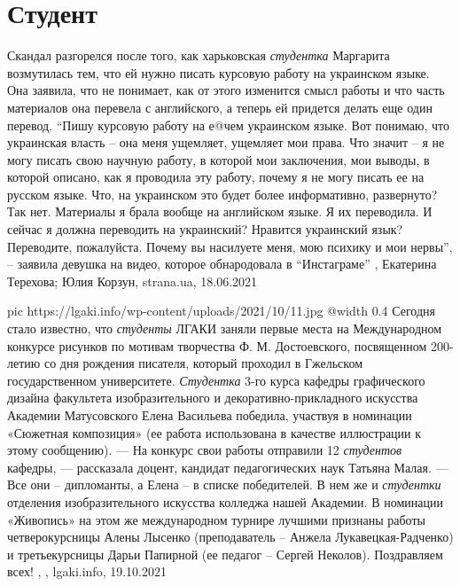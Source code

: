  
 
 
 
 
\chapter{Студент}
\label{sec:slova.student}

Скандал разгорелся после того, как харьковская \emph{студентка} Маргарита возмутилась
тем, что ей нужно писать курсовую работу на украинском языке.  Она заявила, что
не понимает, как от этого изменится смысл работы и что часть материалов она
перевела с английского, а теперь ей придется делать еще один перевод.  \enquote{Пишу
курсовую работу на е@чем украинском языке. Вот понимаю, что украинская власть –
она меня ущемляет, ущемляет мои права. Что значит – я не могу писать свою
научную работу, в которой мои заключения, мои выводы, в которой описано, как я
проводила эту работу, почему я не могу писать ее на русском языке. Что, на
украинском это будет более информативно, развернуто? Так нет.  Материалы я
брала вообще на английском языке. Я их переводила. И сейчас я должна переводить
на украинский? Нравится украинский язык? Переводите, пожалуйста. Почему вы
насилуете меня, мою психику и мои нервы}, – заявила девушка на видео, которое
обнародовала в \enquote{Инстаграме}
, 
Екатерина Терехова; Юлия Корзун, strana.ua, 18.06.2021

\ifcmt
  pic https://lgaki.info/wp-content/uploads/2021/10/11.jpg
  @width 0.4
\fi
Сегодня стало известно, что \emph{студенты} ЛГАКИ заняли первые места на Международном
конкурсе рисунков по мотивам творчества Ф. М. Достоевского, посвященном
200-летию со дня рождения писателя, который проходил в Гжельском
государственном университете.  \emph{Студентка} 3-го курса кафедры графического
дизайна факультета изобразительного и декоративно-прикладного искусства
Академии Матусовского Елена Васильева победила, участвуя в номинации «Сюжетная
композиция» (ее работа использована в качестве иллюстрации к этому сообщению).
— На конкурс свои работы отправили 12 \emph{студентов} кафедры, — рассказала доцент,
кандидат педагогических наук Татьяна Малая. — Все они – дипломанты, а Елена – в
списке победителей.  В нем же и \emph{студентки} отделения изобразительного искусства
колледжа нашей Академии. В номинации «Живопись» на этом же международном
турнире лучшими признаны работы четверокурсницы Алены Лысенко (преподаватель –
Анжела Лукавецкая-Радченко) и третьекурсницы Дарьи Папирной (ее педагог –
Сергей Неколов).  Поздравляем всех!
, , lgaki.info, 19.10.2021

